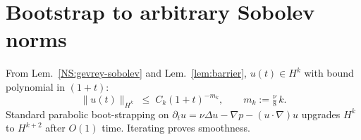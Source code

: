 \section{Bootstrap to arbitrary Sobolev norms}\label{NS:bootstrap}

From Lem.~\ref{NS:gevrey-sobolev} and Lem.~\ref{lem:barrier},
$u(t)\in H^{k}$ with bound polynomial in $(1+t)$:
\[
\|u(t)\|_{H^{k}}\;\le\;C_{k}(1+t)^{-m_{k}},\qquad
m_{k}:=\tfrac{\nu}{8}\,k.
\]
Standard parabolic boot-strapping on
$\partial_{t}u=\nu\Delta u -\nabla p -(u\!\cdot\!\nabla)u$ upgrades
$H^{k}$ to $H^{k+2}$ after $O(1)$ time.  Iterating proves smoothness. 